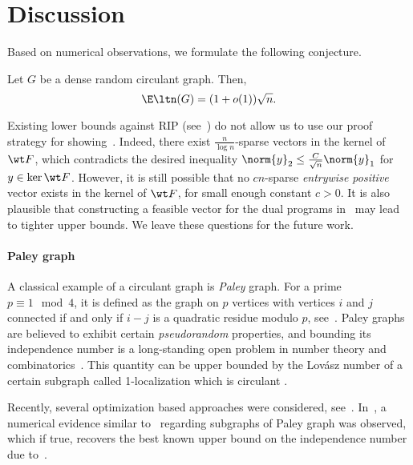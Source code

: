 \section{Discussion}
\label{sec:discussion}
Based on numerical observations, we formulate the following conjecture.

\begin{conjecture}
\label{conj:sharp}
    Let \(G\) be a dense random circulant graph. Then, 
    \begin{equation}
        \E \ltn(G) = (1 + o(1)) \sqrt{n}.
    \end{equation}
\end{conjecture}

Existing lower bounds against RIP (see~\cite{bandeira2018discrete,blasiok2019improved}) do not allow us to use our proof strategy for showing~. Indeed, there exist \(\frac{n}{\log n}\)-sparse vectors in the kernel of \(\wt F\), which contradicts the desired inequality \(\norm{y}_2 \leq \frac{C}{\sqrt{n}} \norm{y}_1\) for \(y \in \ker \wt F\). However, it is still possible that no \(c n\)-sparse \emph{entrywise positive} vector exists in the kernel of \(\wt F\), for small enough constant \(c > 0\). It is also plausible that constructing a feasible vector for the dual programs in~ may lead to tighter upper bounds. We leave these questions for the future work.

\paragraph*{Paley graph}
A classical example of a circulant graph is \textit{Paley} graph. For a prime \(p \equiv 1 \mod 4\), it is defined as the graph on \(p\) vertices with vertices \(i\) and \(j\) connected if and only if \(i - j\) is a quadratic residue modulo \(p\), see~\cite{cohen1988clique, baker1996maximal}. Paley graphs are believed to exhibit certain \textit{pseudorandom} properties, and bounding its independence number is a long-standing open problem in number theory and combinatorics~\cite{hanson2021refined}. This quantity can be upper bounded by the Lovász number of a certain subgraph called 1-localization which is circulant \cite{kunisky2024spectral}.

Recently, several optimization based approaches were considered, see~\cite{kobzar2023revisiting,kunisky2024spectral,wanglower}. In~\cite{magsino2019linear}, a numerical evidence similar to~ regarding subgraphs of Paley graph was observed, which if true, recovers the best known upper bound on the independence number due to~\cite{hanson2021refined}. 

